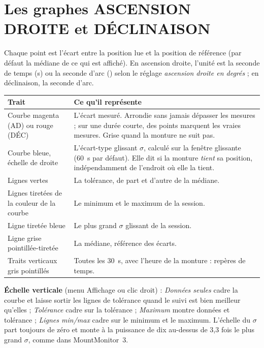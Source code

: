 \section{Les graphes ASCENSION DROITE et DÉCLINAISON}
\label{sec:radec}

Chaque point est l'écart entre la position lue et la position de référence
(par défaut la médiane de ce qui est affiché). En ascension droite, l'unité est
la seconde de temps (s) ou la seconde d'arc (\arcsec) selon le réglage
\emph{ascension droite en degrés} ; en déclinaison, la seconde d'arc.

\begin{center}
\begin{tabularx}{\textwidth}{lX}
\toprule
\textbf{Trait} & \textbf{Ce qu'il représente} \\
\midrule
Courbe magenta (AD) ou rouge (DÉC) & L'écart mesuré. Arrondie sans jamais
dépasser les mesures ; sur une durée courte, des points marquent les vraies
mesures. Grise quand la monture ne suit pas. \\
Courbe bleue, échelle de droite & L'écart-type glissant $\sigma$, calculé sur la
fenêtre glissante (60~s par défaut). Elle dit si la monture \emph{tient} sa
position, indépendamment de l'endroit où elle la tient. \\
Lignes vertes & La tolérance, de part et d'autre de la médiane. \\
Lignes tiretées de la couleur de la courbe & Le minimum et le maximum de la
session. \\
Ligne tiretée bleue & Le plus grand $\sigma$ glissant de la session. \\
Ligne grise pointillée-tiretée & La médiane, référence des écarts. \\
Traits verticaux gris pointillés & Toutes les 30~s, avec l'heure de la
monture : repères de temps. \\
\bottomrule
\end{tabularx}
\end{center}

\textbf{Échelle verticale} (menu Affichage ou clic droit) : \emph{Données
seules} cadre la courbe et laisse sortir les lignes de tolérance quand le
suivi est bien meilleur qu'elles ; \emph{Tolérance} cadre sur la tolérance ;
\emph{Maximum} montre données et tolérance ; \emph{Lignes min/max} cadre sur
le minimum et le maximum. L'échelle du $\sigma$ part toujours de zéro et monte à la
puissance de dix au-dessus de 3,3 fois le plus grand $\sigma$, comme dans
MountMonitor~3.

